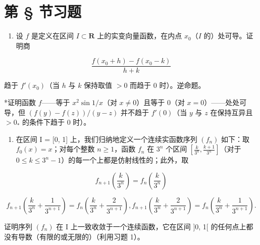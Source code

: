 \section*{第 \S{} 节习题}
{}

\begin{enumerate}
\def\labelenumi{\arabic{enumi})}
\tightlist
\item
  设 \(f\) 是定义在区间 \(I \subset \mathbf{R}\) 上的实变向量函数，在内点 \(x_0\)（\(I\) 的）处可导。证明商
\end{enumerate}

\[
\frac {f (x _ {0} + h) - f (x _ {0} - k)}{h + k}
\]

趋于 \(f'(x_0)\)（当 \(h\) 与 \(k\) 保持取值 \(> 0\) 而趋于 0 时）。逆命题。

*证明函数 \(f\)——等于 \(x^2 \sin 1/x\)（对 \(x \neq 0\)）且等于 0（对 \(x = 0\)）——处处可导，但 \((f(y) - f(z)) / (y - z)\) 并不趋于 \(f'(0)\)（当 \(y\) 与 \(z\) 在保持互异且 \(>0_*\) 的条件下趋于 0 时）。

\begin{enumerate}
\def\labelenumi{\arabic{enumi})}
\setcounter{enumi}{1}
\tightlist
\item
  在区间 I = {[}0, 1{]} 上，我们归纳地定义一个连续实函数序列 \((f_{n})\) 如下：取 \(f_{0}(x) = x\)；对每个整数 \(n \geqslant 1\)，函数 \(f_{n}\) 在 \(3^{n}\) 个区间 \(\left[\frac{k}{3^{n}}, \frac{k+1}{3^{n}}\right]\)（对于 \(0 \leqslant k \leqslant 3^{n}-1\)）的每一个上都是仿射线性的；此外，取
\end{enumerate}

\[
f _ {n + 1} \left(\frac {k}{3 ^ {n}}\right) = f _ {n} \left(\frac {k}{3 ^ {n}}\right)
\]

\[
f _ {n + 1} \left(\frac {k}{3 ^ {n}} + \frac {1}{3 ^ {n + 1}}\right) = f _ {n} \left(\frac {k}{3 ^ {n}} + \frac {2}{3 ^ {n + 1}}\right), f _ {n + 1} \left(\frac {k}{3 ^ {n}} + \frac {2}{3 ^ {n + 1}}\right) = f _ {n} \left(\frac {k}{3 ^ {n}} + \frac {1}{3 ^ {n + 1}}\right).
\]

证明序列 \((f_{n})\) 在 I 上一致收敛于一个连续函数，它在区间 {]}0, 1{[} 的任何点上都没有导数（有限的或无限的）（利用习题 1）。


